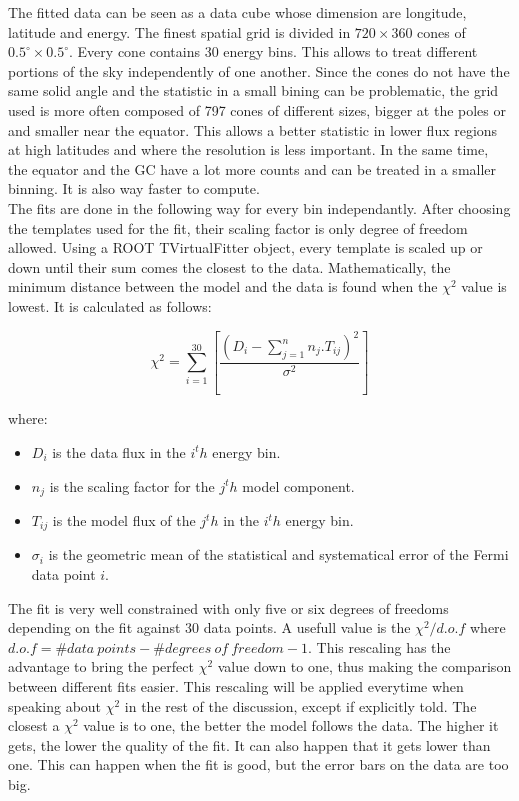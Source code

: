 The fitted data can be seen as a data cube whose dimension are longitude, latitude and energy. The finest spatial grid is divided in $720 \times 360$ cones of $ 0.5^\circ \times 0.5^\circ $. Every cone contains 30 energy bins. This allows to treat different portions of the sky independently of one another. Since the cones do not have the same solid angle and the statistic in a small bining can be problematic, the grid used is more often composed of 797 cones of different sizes, bigger at the poles or and smaller near the equator. This allows a better statistic in lower flux regions at high latitudes and where the resolution is less important. In the same time, the equator and the GC have a lot more counts and can be treated in a smaller binning. It is also way faster to compute.\\

The fits are done in the following way for every bin independantly. After choosing the templates used for the fit, their scaling factor is only degree of freedom allowed. Using a ROOT TVirtualFitter object, every template is scaled up or down until their sum comes the closest to the data. 
Mathematically, the minimum distance between the model and the data is found when the $\chi^2$ value is lowest. It is calculated as follows:

\begin{equation}
\chi^2 = \sum_{i=1}^{30}[\frac{(D_i - \sum_{j=1}^{n}n_j.T_{ij})^2}{\sigma^2}]
\end{equation}

where:
\begin{itemize}
\item $D_i$ is the data flux in the $i^th$ energy bin.
\item $n_j$ is the scaling factor for the $j^th$ model component.
\item $T_{ij}$ is the model flux of the $j^th$ in the $i^th$ energy bin.
\item $\sigma_i$ is the geometric mean of the statistical and systematical error of the Fermi data point $i$.
\end{itemize}

The fit is very well constrained with only five or six degrees of freedoms depending on the fit against 30 data points. A usefull value is the $\chi^2 / d.o.f$ where $d.o.f = \#data\ points - \#degrees\ of\ freedom - 1$. This rescaling has the advantage to bring the perfect $\chi^2$ value down to one, thus making the comparison between different fits easier. This rescaling will be applied everytime when speaking about $\chi^2$ in the rest of the discussion, except if explicitly told. 
The closest a $\chi^2$ value is to one, the better the model follows the data. The higher it gets, the lower the quality of the fit. It can also happen that it gets lower than one. This can happen when the fit is good, but the error bars on the data are too big.

